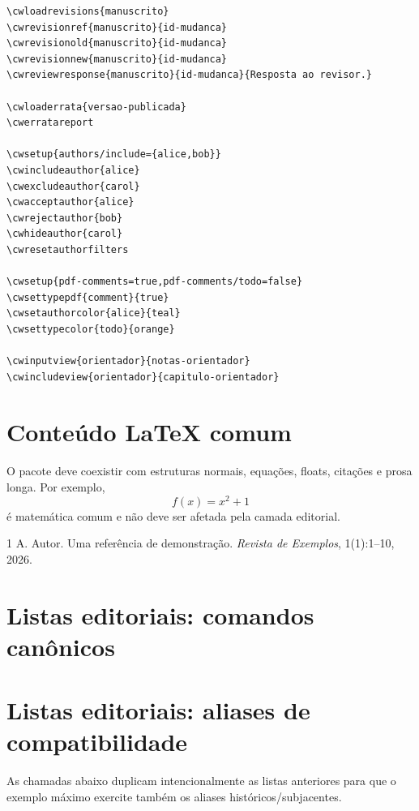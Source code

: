 \documentclass[11pt]{article}
\begin{document}
\begin{verbatim}
\cwloadrevisions{manuscrito}
\cwrevisionref{manuscrito}{id-mudanca}
\cwrevisionold{manuscrito}{id-mudanca}
\cwrevisionnew{manuscrito}{id-mudanca}
\cwreviewresponse{manuscrito}{id-mudanca}{Resposta ao revisor.}

\cwloaderrata{versao-publicada}
\cwerratareport

\cwsetup{authors/include={alice,bob}}
\cwincludeauthor{alice}
\cwexcludeauthor{carol}
\cwacceptauthor{alice}
\cwrejectauthor{bob}
\cwhideauthor{carol}
\cwresetauthorfilters

\cwsetup{pdf-comments=true,pdf-comments/todo=false}
\cwsettypepdf{comment}{true}
\cwsetauthorcolor{alice}{teal}
\cwsettypecolor{todo}{orange}

\cwinputview{orientador}{notas-orientador}
\cwincludeview{orientador}{capitulo-orientador}
\end{verbatim}

\section{Conteúdo LaTeX comum}

O pacote deve coexistir com estruturas normais, equações, floats, citações e
prosa longa. Por exemplo,
\[
  f(x)=x^2+1
\]
é matemática comum e não deve ser afetada pela camada editorial.

\lipsum[2]

\begin{thebibliography}{1}
A. Autor.
\newblock Uma referência de demonstração.
\newblock \emph{Revista de Exemplos}, 1(1):1--10, 2026.
\end{thebibliography}

\clearpage
\section*{Listas editoriais: comandos canônicos}

\listofcomments
\listofcitationneeds
\listofsubjects

\clearpage
\section*{Listas editoriais: aliases de compatibilidade}

As chamadas abaixo duplicam intencionalmente as listas anteriores para que
o exemplo máximo exercite também os aliases históricos/subjacentes.

\listofcomentario
\listofcomentarioref
\listofsubject
\listofassunto
\end{document}
